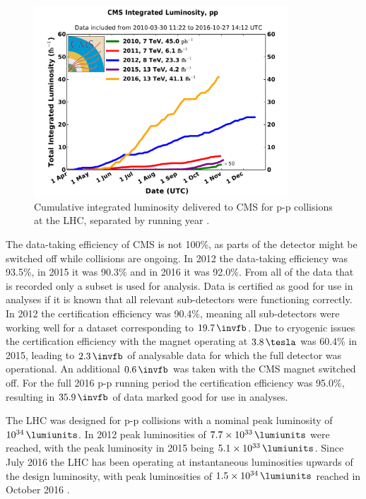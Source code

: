 \begin{figure}[h!]
\includegraphics[width=0.85\textwidth]{./Detector/Plots/int_lumi_cumulative_pp_2.pdf}
\caption[Cumulative integrated luminosity delivered to CMS
for p-p collisions at the LHC, separated by running year.]{Cumulative integrated luminosity delivered to \ac{CMS} for p-p collisions at the \ac{LHC}, separated
by running year \cite{cms-lumi-public}.}
\label{fig:CMSLHC_intlumi}
\end{figure}

The data-taking efficiency of CMS is not 100\%, as parts of the detector might be
switched off while collisions are ongoing. In 2012 the data-taking 
efficiency was 93.5\%, in 2015 it was 90.3\% and in 2016 it was 92.0\%.
From all of the data that is recorded only a subset is used for analysis. Data is 
certified as good for use in analyses if it is known that all relevant sub-detectors
were functioning correctly. In 2012 the certification efficiency was 90.4\%, 
meaning all sub-detectors were working well for a dataset corresponding to $19.7\,\invfb$. %
Due to cryogenic issues the certification efficiency with the magnet operating
at $3.8\,\tesla$ was 60.4\% in 2015, leading to $2.3\,\invfb$ of 
analysable data for which the full detector was operational. An additional $0.6\,\invfb$
was taken with the \ac{CMS} magnet switched off. For the full 2016 p-p running period
the certification efficiency was 95.0\%, resulting in $35.9\,\invfb$ of data marked good %
for use in analyses.

The \ac{LHC} was designed for p-p collisions with a nominal
peak luminosity of $10^{34}\,\lumiunits$. In 2012 peak
luminosities of $7.7\times 10^{33}\,\lumiunits$ were reached, with the peak luminosity in
2015 being $5.1\times 10^{33}\,\lumiunits$. Since July 2016
the \ac{LHC} has been operating at instantaneous luminosities upwards of the 
design luminosity, with peak luminosities of $1.5\times10^{34}\,\lumiunits$ reached
in October 2016 \cite{cms-lumi-public}.

